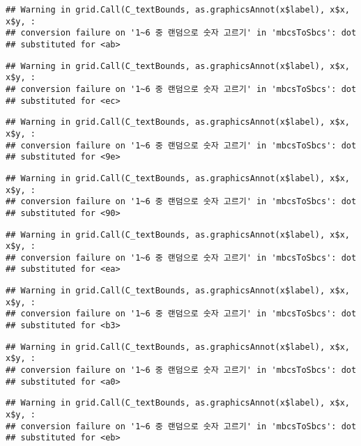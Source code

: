 \documentclass[]{book}
\begin{document}
\begin{verbatim}
## Warning in grid.Call(C_textBounds, as.graphicsAnnot(x$label), x$x, x$y, :
## conversion failure on '1~6 중 랜덤으로 숫자 고르기' in 'mbcsToSbcs': dot
## substituted for <ab>
\end{verbatim}

\begin{verbatim}
## Warning in grid.Call(C_textBounds, as.graphicsAnnot(x$label), x$x, x$y, :
## conversion failure on '1~6 중 랜덤으로 숫자 고르기' in 'mbcsToSbcs': dot
## substituted for <ec>
\end{verbatim}

\begin{verbatim}
## Warning in grid.Call(C_textBounds, as.graphicsAnnot(x$label), x$x, x$y, :
## conversion failure on '1~6 중 랜덤으로 숫자 고르기' in 'mbcsToSbcs': dot
## substituted for <9e>
\end{verbatim}

\begin{verbatim}
## Warning in grid.Call(C_textBounds, as.graphicsAnnot(x$label), x$x, x$y, :
## conversion failure on '1~6 중 랜덤으로 숫자 고르기' in 'mbcsToSbcs': dot
## substituted for <90>
\end{verbatim}

\begin{verbatim}
## Warning in grid.Call(C_textBounds, as.graphicsAnnot(x$label), x$x, x$y, :
## conversion failure on '1~6 중 랜덤으로 숫자 고르기' in 'mbcsToSbcs': dot
## substituted for <ea>
\end{verbatim}

\begin{verbatim}
## Warning in grid.Call(C_textBounds, as.graphicsAnnot(x$label), x$x, x$y, :
## conversion failure on '1~6 중 랜덤으로 숫자 고르기' in 'mbcsToSbcs': dot
## substituted for <b3>
\end{verbatim}

\begin{verbatim}
## Warning in grid.Call(C_textBounds, as.graphicsAnnot(x$label), x$x, x$y, :
## conversion failure on '1~6 중 랜덤으로 숫자 고르기' in 'mbcsToSbcs': dot
## substituted for <a0>
\end{verbatim}

\begin{verbatim}
## Warning in grid.Call(C_textBounds, as.graphicsAnnot(x$label), x$x, x$y, :
## conversion failure on '1~6 중 랜덤으로 숫자 고르기' in 'mbcsToSbcs': dot
## substituted for <eb>
\end{verbatim}
\end{document}
